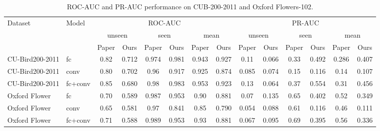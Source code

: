 
\begin{table}[t]
\centering
\scriptsize
\caption{ROC-AUC and PR-AUC performance on CUB-200-2011 and Oxford Flowers-102.}
\label{tab:table1}
\begin{tabular}{llcccccccccccc}
\toprule
Dataset & Model & \multicolumn{6}{c}{ROC-AUC} & \multicolumn{6}{c}{PR-AUC} \\
\cmidrule(lr){3-8} \cmidrule(lr){9-14}
 & & \multicolumn{2}{c}{unseen} & \multicolumn{2}{c}{seen} & \multicolumn{2}{c}{mean} & \multicolumn{2}{c}{unseen} & \multicolumn{2}{c}{seen} & \multicolumn{2}{c}{mean} \\
\cmidrule(lr){3-4} \cmidrule(lr){5-6} \cmidrule(lr){7-8} \cmidrule(lr){9-10} \cmidrule(lr){11-12} \cmidrule(lr){13-14}
 & & Paper & Ours & Paper & Ours & Paper & Ours & Paper & Ours & Paper & Ours & Paper & Ours \\
\midrule
CU-Bird200-2011 & fc & 0.82 & 0.712 & 0.974 & 0.981 & 0.943 & 0.927 & 0.11 & 0.066 & 0.33 & 0.492 & 0.286 & 0.407 \\
CU-Bird200-2011 & conv & 0.80 & 0.702 & 0.96 & 0.917 & 0.925 & 0.874 & 0.085 & 0.074 & 0.15 & 0.116 & 0.14 & 0.107 \\
CU-Bird200-2011 & fc+conv & 0.85 & 0.680 & 0.98 & 0.983 & 0.953 & 0.923 & 0.13 & 0.064 & 0.37 & 0.554 & 0.31 & 0.456 \\
Oxford Flower & fc & 0.70 & 0.589 & 0.987 & 0.953 & 0.90 & 0.881 & 0.07 & 0.135 & 0.65 & 0.402 & 0.52 & 0.349 \\
Oxford Flower & conv & 0.65 & 0.581 & 0.97 & 0.841 & 0.85 & 0.790 & 0.054 & 0.088 & 0.61 & 0.116 & 0.46 & 0.111 \\
Oxford Flower & fc+conv & 0.71 & 0.588 & 0.989 & 0.953 & 0.93 & 0.881 & 0.067 & 0.095 & 0.69 & 0.395 & 0.56 & 0.336 \\
\bottomrule
\end{tabular}
\end{table}

